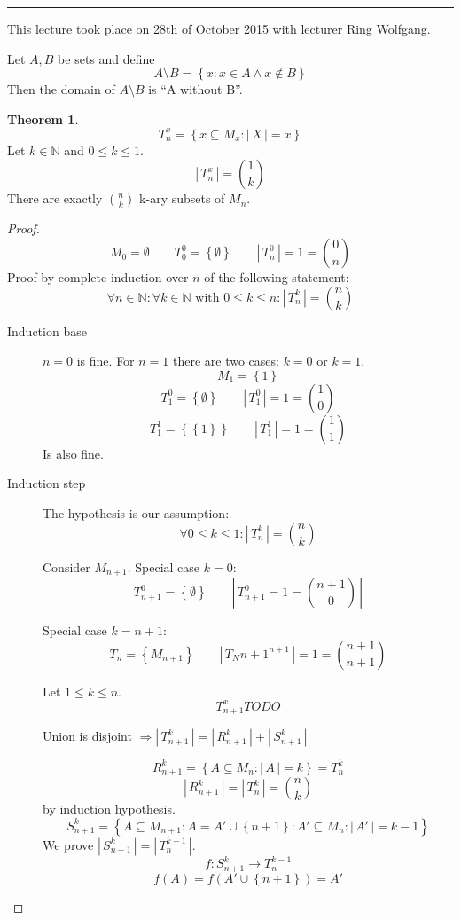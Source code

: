 \documentclass[a4paper,landscape,twocolumn]{article}
\theoremstyle{definition}
\newtheorem{theorem}{Theorem}
\newcommand\set[1]{\left\{#1\right\}}
\newcommand\card[1]{\left|\,#1\,\right|}
\newcommand\meta[3]{\hrule{} This #1 took place on #2 with lecturer #3.\par}
\begin{document}
\meta{lecture}{28th of October 2015}{Ring Wolfgang}

Let $A, B$ be sets and define
\[ A \setminus B = \set{x: x \in A \land x \not\in B} \]
Then the domain of $A \setminus B$ is \enquote{A without B}.

\begin{theorem}
  \[ T_n^x = \set{x \subseteq M_x: \card{X} = x} \]
  Let $k \in \mathbb{N}$ and $0 \leq k \leq 1$.
  \[ \card{T_n^x} = \binom{1}{k} \]
  There are exactly $\binom{n}{k}$ k-ary subsets of $M_n$.
\end{theorem}

\begin{proof}
  \[
      M_0 = \emptyset \qquad
      T_0^0 = \set{\emptyset} \qquad
      \card{T_n^0} = 1 = \binom{0}{n}
  \]
  Proof by complete induction over $n$ of the following statement:
  \[
    \forall n \in \mathbb{N}: \forall k \in \mathbb{N} \text{ with } 0 \leq k \leq n:
    \card{T_n^k} = \binom{n}{k}
  \]
  \begin{description}
    \item[Induction base]
      $n = 0$ is fine.
      For $n = 1$ there are two cases: $k = 0$ or $k = 1$.
      \[ M_1 = \set{1} \]
      \[ T_1^0 = \set{\emptyset} \qquad \card{T_1^0} = 1 = \binom{1}{0} \]
      \[ T_1^1 = \set{\set{1}} \qquad \card{T_1^1} = 1 = \binom{1}{1} \]
      Is also fine.
    \item[Induction step]
      The hypothesis is our assumption:
      \[ \forall 0 \leq k \leq 1: \card{T_n^k} = \binom{n}{k} \]

      Consider $M_{n+1}$. Special case $k = 0$:
      \[ T_{n+1}^0 = \set{\emptyset} \qquad \card{T_{n+1}^0 = 1 = \binom{n+1}{0}} \]

      Special case $k = n + 1$:
      \[ T_n^{} = \set{M_{n+1}} \qquad \card{T_N{n+1}^{n+1}} = 1 = \binom{n+1}{n+1} \]

      Let $1 \leq k \leq n$.
      \[ T_{n+1}^x TODO \]

      Union is disjoint $\Rightarrow \card{T_{n+1}^k} = \card{R_{n+1}^k} + \card{S_{n+1}^k}$

      \[ R_{n+1}^k = \set{A \subseteq M_n: \card{A} = k} = T_n^k \]
      \[ \card{R_{n+1}^k} = \card{T_n^k} = \binom{n}{k} \]
      by induction hypothesis.
      \[ S_{n+1}^k = \set{A \subseteq M_{n+1}: A = A' \cup \set{n+1}: A' \subseteq M_n: \card{A'} = k - 1} \]
      We prove $\card{S_{n+1}^k} = \card{T_n^{k-1}}$.
      \[ f: S_{n+1}^k \rightarrow T_n^{k-1} \]
      \[ f(A) = f(A' \cup \set{n+1}) = A' \]


\end{description}
\end{proof}
\end{document}
